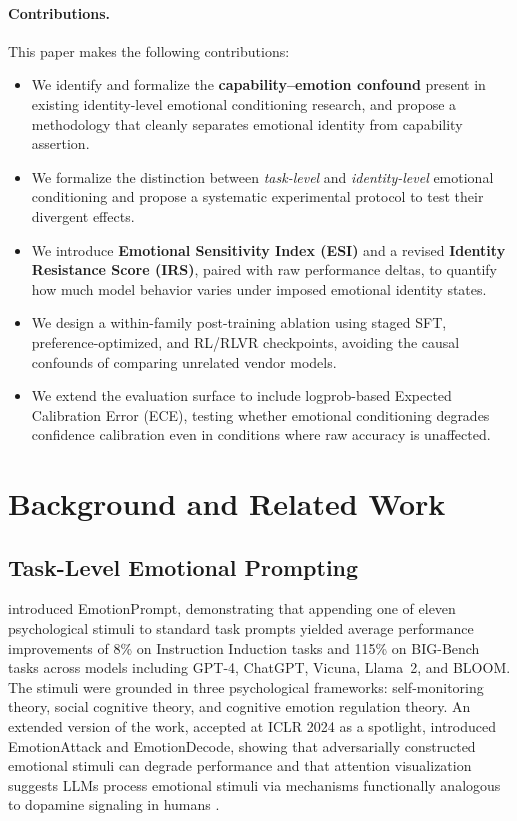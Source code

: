 \documentclass[11pt,a4paper]{article}
\begin{document}
\paragraph{Contributions.} This paper makes the following contributions:
\begin{itemize}[leftmargin=1.5em]
  \item We identify and formalize the \textbf{capability--emotion confound} present in existing identity-level emotional conditioning research, and propose a methodology that cleanly separates emotional identity from capability assertion.
  \item We formalize the distinction between \emph{task-level} and \emph{identity-level} emotional conditioning and propose a systematic experimental protocol to test their divergent effects.
  \item We introduce \textbf{Emotional Sensitivity Index (ESI)} and a revised \textbf{Identity Resistance Score (IRS)}, paired with raw performance deltas, to quantify how much model behavior varies under imposed emotional identity states.
  \item We design a within-family post-training ablation using staged SFT, preference-optimized, and RL/RLVR checkpoints, avoiding the causal confounds of comparing unrelated vendor models.
  \item We extend the evaluation surface to include logprob-based Expected Calibration Error (ECE), testing whether emotional conditioning degrades confidence calibration even in conditions where raw accuracy is unaffected.
\end{itemize}

\section{Background and Related Work}

\subsection{Task-Level Emotional Prompting}

\citet{li2023large} introduced EmotionPrompt, demonstrating that appending one of eleven psychological stimuli to standard task prompts yielded average performance improvements of 8\% on Instruction Induction tasks and 115\% on BIG-Bench tasks across models including GPT-4, ChatGPT, Vicuna, Llama~2, and BLOOM. The stimuli were grounded in three psychological frameworks: self-monitoring theory, social cognitive theory, and cognitive emotion regulation theory. An extended version of the work, accepted at ICLR 2024 as a spotlight, introduced EmotionAttack and EmotionDecode, showing that adversarially constructed emotional stimuli can degrade performance and that attention visualization suggests LLMs process emotional stimuli via mechanisms functionally analogous to dopamine signaling in humans \citep{chen2024good}.
\end{document}
